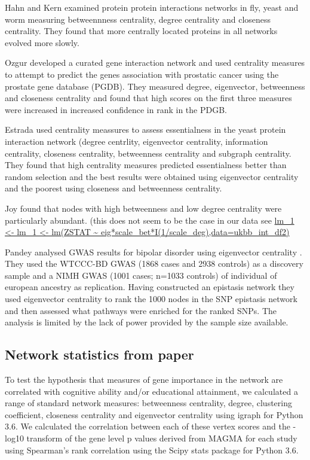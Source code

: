 Hahn and Kern\cite{hahn2005comparative} examined protein protein interactions networks in fly, yeast and worm measuring betweennness centrality, degree centrality and closeness centrality. They found that more centrally located proteins in all networks evolved more slowly. 

Ozgur \cite{ozgur2008identifying} developed a curated gene interaction network and used centrality measures to attempt to predict the genes association with prostatic cancer using the prostate gene database (PGDB). They measured degree, eigenvector, betweenness and closeness centrality and found that high scores on the first three measures were increased in increased confidence in rank in the PDGB.

Estrada \cite{estrada2006virtual} used centrality meassures to assess essentialness in the yeast protein interaction network (degree centrlity, eigenvector centrality, information centrality, closeness centrality, betweenness centrality and subgraph centrality. They found that high centrality measures predicted essentialness better than random selection and  the best results were obtained using eigenvector centrality and the poorest using closeness and betweenness centrality. 

Joy found that nodes with high betweenness and low degree centrality were particularly abundant.\cite{joy2005high} (this does not seem to be the case in our data see \url{lm_1 <- lm_1 <- lm(ZSTAT ~  eig*scale_bet*I(1/scale_deg),data=ukbb_int_df2)}

Pandey analysed GWAS results for bipolar disorder using eigenvector centrality \cite{pandey2012epistasis}. They used the WTCCC-BD GWAS (1868 cases and 2938 controls) as a discovery sample and  a NIMH GWAS (1001 cases; n=1033 controls) of individual of european ancestry as replication. Having constructed an epistasis network they used eigenvector centrality to rank the 1000 nodes in the SNP epistasis network and then assessed what pathways were enriched for the ranked SNPs. The analysis is limited by the lack of power provided by the sample size available.



\subsection{Network statistics from paper}
\label{sec: network statistics from paper}

To test the hypothesis that measures of gene importance in the network are correlated with cognitive ability and/or educational attainment, we calculated a range of standard network measures: betweenness centrality, degree, clustering coefficient, closeness centrality and eigenvector centrality using igraph for Python 3.6. \cite{csardi2006igraph}  We calculated the correlation between each of these vertex scores and the -log10 transform of the gene level p values derived from MAGMA for each study using Spearman’s rank correlation using the Scipy stats package for Python 3.6. 
